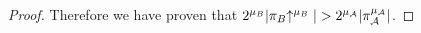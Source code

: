 \begin{proof}
%
Therefore we have proven that $2^{\mu_B} \vert \pi_B \negthickspace\uparrow^{\mu_B} \vert > 2^{\mu_\mathcal{A}} \vert \pi_\mathcal{A}^{\mu_\mathcal{A}} \vert$.
\end{proof}